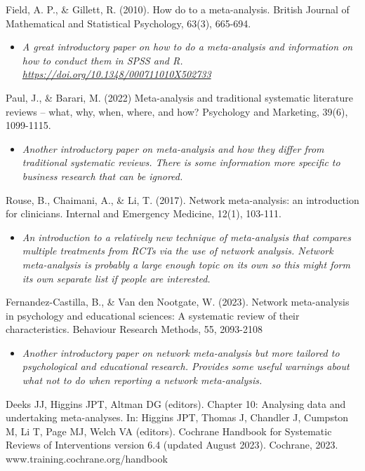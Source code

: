 \documentclass[
]{book}
\providecommand{\tightlist}{%
  \setlength{\itemsep}{0pt}\setlength{\parskip}{0pt}}
\begin{document}
Field, A. P., \& Gillett, R. (2010). How do to a meta-analysis. British Journal of Mathematical and Statistical Psychology, 63(3), 665-694.

\begin{itemize}
\tightlist
\item
  \emph{A great introductory paper on how to do a meta-analysis and information on how to conduct them in SPSS and R. \url{https://doi.org/10.1348/000711010X502733} }
\end{itemize}

Paul, J., \& Barari, M. (2022) Meta-analysis and traditional systematic literature reviews -- what, why, when, where, and how? Psychology and Marketing, 39(6), 1099-1115.

\begin{itemize}
\tightlist
\item
  \emph{Another introductory paper on meta-analysis and how they differ from traditional systematic reviews. There is some information more specific to business research that can be ignored. }
\end{itemize}

Rouse, B., Chaimani, A., \& Li, T. (2017). Network meta-analysis: an introduction for clinicians. Internal and Emergency Medicine, 12(1), 103-111.

\begin{itemize}
\tightlist
\item
  \emph{An introduction to a relatively new technique of meta-analysis that compares multiple treatments from RCTs via the use of network analysis. Network meta-analysis is probably a large enough topic on its own so this might form its own separate list if people are interested.}
\end{itemize}

Fernandez-Castilla, B., \& Van den Nootgate, W. (2023). Network meta-analysis in psychology and educational sciences: A systematic review of their characteristics. Behaviour Research Methods, 55, 2093-2108

\begin{itemize}
\tightlist
\item
  \emph{Another introductory paper on network meta-analysis but more tailored to psychological and educational research. Provides some useful warnings about what not to do when reporting a network meta-analysis.}
\end{itemize}

Deeks JJ, Higgins JPT, Altman DG (editors). Chapter 10: Analysing data and undertaking meta-analyses. In: Higgins JPT, Thomas J, Chandler J, Cumpston M, Li T, Page MJ, Welch VA (editors). Cochrane Handbook for Systematic Reviews of Interventions version 6.4 (updated August 2023). Cochrane, 2023. www.training.cochrane.org/handbook
\end{document}
